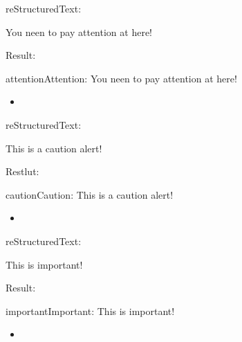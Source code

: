 \documentclass[letterpaper,12pt,english]{sphinxmanual}
\begin{document}
reStructuredText:

\begin{sphinxVerbatim}[commandchars=\\\{\}]
 

   You neen to pay attention at here!
\end{sphinxVerbatim}

Result:

\begin{sphinxadmonition}{attention}{Attention:}
You neen to pay attention at here!
\end{sphinxadmonition}
\begin{itemize}
\item {} 

\end{itemize}

reStructuredText:

\begin{sphinxVerbatim}[commandchars=\\\{\}]
 

   This is a caution alert!
\end{sphinxVerbatim}

Restlut:

\begin{sphinxadmonition}{caution}{Caution:}
This is a caution alert!
\end{sphinxadmonition}
\begin{itemize}
\item {} 

\end{itemize}

reStructuredText:

\begin{sphinxVerbatim}[commandchars=\\\{\}]
 

        This is important!
\end{sphinxVerbatim}

Result:

\begin{sphinxadmonition}{important}{Important:}
This is important!
\end{sphinxadmonition}
\begin{itemize}
\item {} 

\end{itemize}
\end{document}
